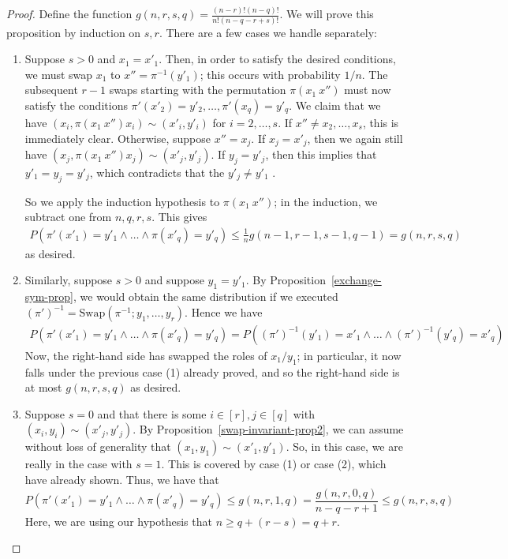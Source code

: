 \begin{proof}

Define the function $g(n,r,s,q) =  \frac{(n-r)! (n-q)!}{n! (n-q-r+s)!}$.  We will prove this proposition by induction on $s, r$. There are a few cases we handle separately:
\begin{enumerate}
\item Suppose $s > 0$ and $x_1 = x'_1$. Then, in order to satisfy the desired conditions, we must swap $x_1$ to $x'' = \pi^{-1} (y'_1)$; this occurs with probability $1/n$. The subsequent $r-1$ swaps starting with the permutation $\pi (x_1 \ x'')$ must now satisfy the conditions $\pi'(x'_2) = y'_2, \dots, \pi'(x_q) = y'_q$. We claim that we have $(x_i, \pi(x_1 \ x'') x_i) \sim (x'_i, y'_i)$ for $i = 2, \dots, s$. If $x'' \neq x_2, \dots, x_s$, this is immediately clear. Otherwise, suppose $x'' = x_j$. If $x_j = x'_j$, then we again still have $(x_j, \pi(x_1 \ x'') x_j) \sim (x'_j, y'_j)$. If $y_j = y'_j$, then this implies that $y'_1 = y_j = y'_j$, which contradicts that the $y'_j \neq y'_1$ .

 So we apply the induction hypothesis to $\pi(x_1 \ x'')$; in the induction, we subtract one from $n, q, r, s$. This gives
\begin{align*}
P(\pi'(x'_1) = y'_1 \wedge \dots \wedge \pi(x'_q) = y'_q) \leq \tfrac{1}{n} g(n-1,r-1,s-1,q-1) = g(n,r,s,q)
\end{align*}
as desired.
\item Similarly, suppose $s > 0$ and suppose $y_1 = y'_1$.  By Proposition~\ref{exchange-sym-prop}, we would obtain the same distribution if we executed $(\pi')^{-1} = \text{Swap} (\pi^{-1}; y_1, \dots, y_r)$. Hence we have
\begin{align*}
P(\pi'(x'_1) = y'_1 \wedge \dots \wedge \pi(x'_q) = y'_q) = P((\pi')^{-1}(y'_1) = x'_1 \wedge \dots \wedge (\pi')^{-1} (y'_q) = x'_q)
\end{align*}
Now, the right-hand side has swapped the roles of $x_1/y_1$; in particular, it now falls under the previous case (1) already proved, and so the right-hand side is at most $g(n,r,s,q)$ as desired.


\item Suppose $s = 0$ and that there is some $i \in [r], j \in [q]$ with $(x_i, y_i) \sim (x'_j, y'_j)$. By Proposition~\ref{swap-invariant-prop2}, we can assume without loss of generality that $(x_1, y_1) \sim (x'_1, y'_1)$. So, in this case, we are really in the case with $s = 1$. This is covered by case (1) or case (2), which have already shown. Thus, we have that
$$
P(\pi'(x'_1) = y'_1 \wedge \dots \wedge \pi(x'_q) = y'_q) \leq g(n,r,1,q) = \frac{g(n,r,0,q)}{n - q - r + 1} \leq g(n,r,s,q)
$$
Here, we are using our hypothesis that $n \geq q + (r-s) = q + r$.


\end{enumerate}
\end{proof}
